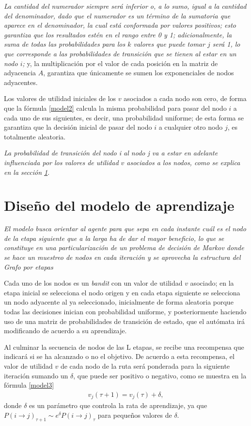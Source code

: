 \textit{La cantidad del numerador siempre será inferior o, a lo sumo, igual a la cantidad del denominador, dado que el numerador es un término de la sumatoria que aparece en el denominador, la cual está conformada por valores positivos; esto garantiza que los resultados estén en el rango entre 0 y 1; adicionalmente, la suma de todas las probabilidades para los $k$ valores que puede tomar $j$ será 1, lo que corresponde a las probabilidades de transición que se tienen al estar en un nodo $i$;} y, la multiplicación por el valor de cada posición en la matriz de adyacencia $A$, garantiza que únicamente se sumen los exponenciales de nodos adyacentes.

Los valores de utilidad iniciales de los $v$ asociados a cada nodo son cero, de forma que la fórmula \ref{model2} calcula la misma probabilidad para pasar del nodo $i$ a cada uno de sus siguientes, es decir, una probabilidad uniforme; de esta forma se garantiza que la decisión inicial de pasar del nodo $i$ a cualquier otro nodo $j$, es totalmente aleatoria. 

\textit{La probabilidad de transición del nodo i al nodo j va a estar en adelante influenciada por los valores de utilidad $v$ asociados a los nodos, como se explica en la sección \ref{aprende}}.

\section{Diseño del modelo de aprendizaje} 
\label{aprende}

\textit{El modelo busca orientar al agente para que sepa en cada instante cuál es el nodo de la etapa siguiente que a la larga ha de dar el mayor beneficio, lo que se constituye en una particularización de un problema de decisión de Markov donde se hace un muestreo de nodos en cada iteración y se aprovecha la estructura del Grafo por etapas}

Cada uno de los nodos es un \textit{bandit} con un valor de utilidad $v$ asociado; en la etapa inicial se selecciona el nodo origen y en cada etapa siguiente se selecciona un nodo adyacente al ya seleccionado, inicialmente de forma aleatoria porque todas las decisiones inician con probabilidad uniforme, y posteriormente haciendo uso de una matriz de probabilidades de transición de estado, que el autómata irá modificando de acuerdo a su aprendizaje.

Al culminar la secuencia de nodos de las L etapas, se recibe una recompensa que indicará si se ha alcanzado o no el objetivo. De acuerdo a esta recompensa, el valor de utilidad $v$ de cada nodo de la ruta será ponderada para la siguiente iteración sumando un $\delta$, que puede ser positivo o negativo, como se muestra en la fórmula \ref{model3}
\begin{eqnarray}\label{model3}
v_j(\tau + 1) = v_j(\tau) + \delta,
\end{eqnarray}
donde $\delta$ es un parámetro que controla la rata de aprendizaje, ya que $P(i \to j)_{\tau+1} \sim e^{\delta} P(i \to j)_{\tau}$ para pequeños valores de $\delta$.

